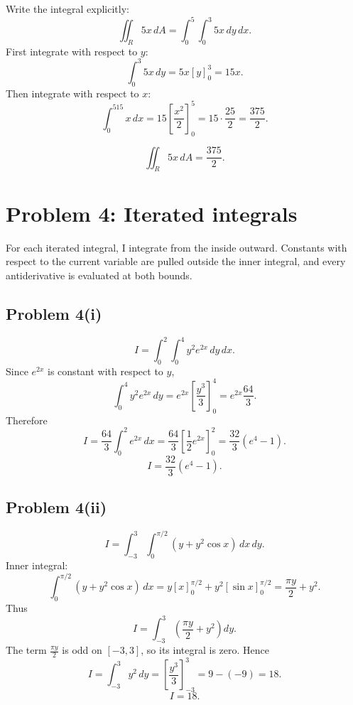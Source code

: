 \documentclass[11pt,a4paper]{article}
\begin{document}
Write the integral explicitly:
\[
 \iint_R5x\,dA
 =\int_0^5\int_0^3 5x\,dy\,dx.
\]
First integrate with respect to \(y\):
\[
 \int_0^3 5x\,dy=5x[y]_0^3=15x.
\]
Then integrate with respect to \(x\):
\[
 \int_0^515x\,dx=15\left[\frac{x^2}{2}\right]_0^5
 =15\cdot\frac{25}{2}=\frac{375}{2}.
\]

\begin{answerbox}
\[
\boxed{\iint_R5x\,dA=\frac{375}{2}.}
\]
\end{answerbox}

\section{Problem 4: Iterated integrals}

\begin{methodbox}
For each iterated integral, I integrate from the inside outward.  Constants with respect to the current variable are pulled outside the inner integral, and every antiderivative is evaluated at both bounds.
\end{methodbox}

\subsection{Problem 4(i)}
\[
 I=\int_0^2\int_0^4 y^2e^{2x}\,dy\,dx.
\]
Since \(e^{2x}\) is constant with respect to \(y\),
\[
 \int_0^4y^2e^{2x}\,dy=e^{2x}\left[\frac{y^3}{3}\right]_0^4
 =e^{2x}\frac{64}{3}.
\]
Therefore
\[
 I=\frac{64}{3}\int_0^2e^{2x}\,dx
 =\frac{64}{3}\left[\frac12e^{2x}\right]_0^2
 =\frac{32}{3}(e^4-1).
\]
\[
\boxed{I=\frac{32}{3}(e^4-1).}
\]

\subsection{Problem 4(ii)}
\[
 I=\int_{-3}^{3}\int_0^{\pi/2}(y+y^2\cos x)\,dx\,dy.
\]
Inner integral:
\[
 \int_0^{\pi/2}(y+y^2\cos x)\,dx
 =y\left[x\right]_0^{\pi/2}+y^2\left[\sin x\right]_0^{\pi/2}
 =\frac{\pi y}{2}+y^2.
\]
Thus
\[
 I=\int_{-3}^{3}\left(\frac{\pi y}{2}+y^2\right)dy.
\]
The term \(\frac{\pi y}{2}\) is odd on \([-3,3]\), so its integral is zero.  Hence
\[
 I=\int_{-3}^{3}y^2\,dy
 =\left[\frac{y^3}{3}\right]_{-3}^{3}
 =9-(-9)=18.
\]
\[
\boxed{I=18.}
\]
\end{document}

